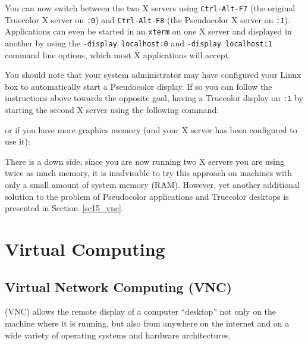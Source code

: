 \documentclass[twoside,11pt]{starlink}
\begin{document}
You can now switch between the two X servers using \texttt{Ctrl-Alt-F7}
(the original Truecolor X server on \texttt{:0}) and \texttt{Ctrl-Alt-F8}
(the Pseudocolor X server on \texttt{:1}). Applications can even be
started in an \texttt{xterm} on one X server and displayed in another by
using the \texttt{-display localhost:0} and \texttt{-display localhost:1}
command line options, which most X applications will accept.

You should note that your system administrator may have configured
your Linux box to automatically start a Pseudocolor display. If so you
can follow the instructions above towards the opposite goal, having a
Truecolor display on \texttt{:1} by starting the second X server using
the following command:

\begin{terminalv}
\end{terminalv}

or if you have more graphics memory (and your X server has been configured to use it):

\begin{terminalv}
\end{terminalv}

There is a down side, since you are now running two X servers you are
using twice as much memory, it is inadvisable to try this approach on
machines with only a small amount of system memory (RAM). However, yet
another additional solution to the problem of Pseudocolor applications
and Truecolor desktops is presented in Section~\ref{sc15_vnc}.



\section{Virtual Computing\label{sc15_virtual}}

\subsection{Virtual Network Computing (VNC)\label{sc15_vnc}}

 (VNC) allows the
remote display of a computer ``desktop'' not only on the machine where
it is running, but also from anywhere on the internet and on a wide
variety of operating systems and hardware architectures.
\end{document}
